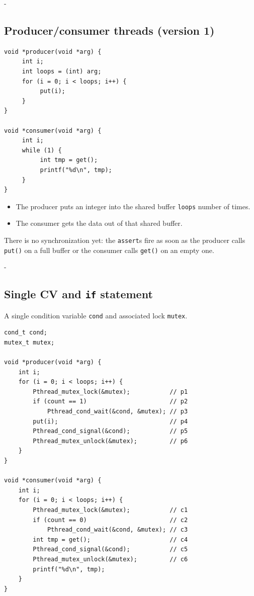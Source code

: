 \documentclass[11pt,a4paper]{article}
\makeatletter
\newcommand{\keepspace}[1]{\par\penalty-100\begingroup
  \setlength{\dimen@}{#1}\dimen@ii\pagegoal\advance\dimen@ii-\pagetotal
  \ifdim\dimen@>\dimen@ii\ifdim\dimen@ii>\z@\vfil\fi\break\fi\endgroup}
\makeatother
\begin{document}
\keepspace{20\baselineskip}
\subsection{Producer/consumer threads (version 1)}

\begin{lstlisting}
void *producer(void *arg) {
     int i;
     int loops = (int) arg;
     for (i = 0; i < loops; i++) {
          put(i);
     }
}

void *consumer(void *arg) {
     int i;
     while (1) {
          int tmp = get();
          printf("%d\n", tmp);
     }
}
\end{lstlisting}

\begin{itemize}
  \item The producer puts an integer into the shared buffer \texttt{loops}
        number of times.
  \item The consumer gets the data out of that shared buffer.
\end{itemize}
There is no synchronization yet: the \texttt{assert}s fire as soon as the
producer calls \texttt{put()} on a full buffer or the consumer calls
\texttt{get()} on an empty one.

\keepspace{34\baselineskip}
\subsection{Single CV and \texttt{if} statement}

A single condition variable \texttt{cond} and associated lock
\texttt{mutex}.

\begin{lstlisting}
cond_t cond;
mutex_t mutex;

void *producer(void *arg) {
    int i;
    for (i = 0; i < loops; i++) {
        Pthread_mutex_lock(&mutex);           // p1
        if (count == 1)                       // p2
            Pthread_cond_wait(&cond, &mutex); // p3
        put(i);                               // p4
        Pthread_cond_signal(&cond);           // p5
        Pthread_mutex_unlock(&mutex);         // p6
    }
}

void *consumer(void *arg) {
    int i;
    for (i = 0; i < loops; i++) {
        Pthread_mutex_lock(&mutex);           // c1
        if (count == 0)                       // c2
            Pthread_cond_wait(&cond, &mutex); // c3
        int tmp = get();                      // c4
        Pthread_cond_signal(&cond);           // c5
        Pthread_mutex_unlock(&mutex);         // c6
        printf("%d\n", tmp);
    }
}
\end{lstlisting}
\end{document}
